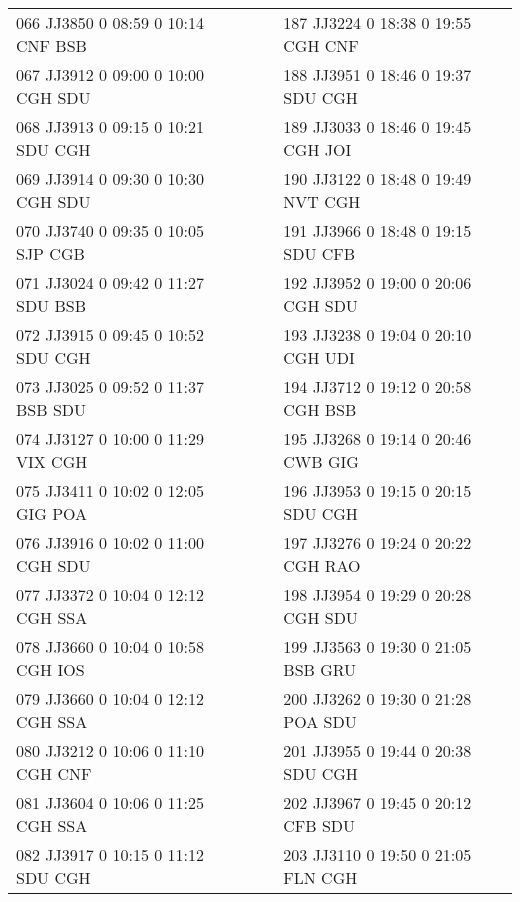 \begin{scriptsize}
\begin{longtable}{l c c l}
066 JJ3850 0 08:59 0 10:14 CNF BSB & & & 187 JJ3224 0 18:38 0 19:55 CGH CNF \\

067 JJ3912 0 09:00 0 10:00 CGH SDU & & & 188 JJ3951 0 18:46 0 19:37 SDU CGH \\

068 JJ3913 0 09:15 0 10:21 SDU CGH & & & 189 JJ3033 0 18:46 0 19:45 CGH JOI \\

069 JJ3914 0 09:30 0 10:30 CGH SDU & & & 190 JJ3122 0 18:48 0 19:49 NVT CGH \\

070 JJ3740 0 09:35 0 10:05 SJP CGB & & & 191 JJ3966 0 18:48 0 19:15 SDU CFB \\

071 JJ3024 0 09:42 0 11:27 SDU BSB & & & 192 JJ3952 0 19:00 0 20:06 CGH SDU \\

072 JJ3915 0 09:45 0 10:52 SDU CGH & & & 193 JJ3238 0 19:04 0 20:10 CGH UDI \\

073 JJ3025 0 09:52 0 11:37 BSB SDU & & & 194 JJ3712 0 19:12 0 20:58 CGH BSB \\

074 JJ3127 0 10:00 0 11:29 VIX CGH & & & 195 JJ3268 0 19:14 0 20:46 CWB GIG \\

075 JJ3411 0 10:02 0 12:05 GIG POA & & & 196 JJ3953 0 19:15 0 20:15 SDU CGH \\

076 JJ3916 0 10:02 0 11:00 CGH SDU & & & 197 JJ3276 0 19:24 0 20:22 CGH RAO \\

077 JJ3372 0 10:04 0 12:12 CGH SSA & & & 198 JJ3954 0 19:29 0 20:28 CGH SDU \\

078 JJ3660 0 10:04 0 10:58 CGH IOS & & & 199 JJ3563 0 19:30 0 21:05 BSB GRU \\

079 JJ3660 0 10:04 0 12:12 CGH SSA & & & 200 JJ3262 0 19:30 0 21:28 POA SDU \\

080 JJ3212 0 10:06 0 11:10 CGH CNF & & & 201 JJ3955 0 19:44 0 20:38 SDU CGH \\

081 JJ3604 0 10:06 0 11:25 CGH SSA & & & 202 JJ3967 0 19:45 0 20:12 CFB SDU \\

082 JJ3917 0 10:15 0 11:12 SDU CGH & & & 203 JJ3110 0 19:50 0 21:05 FLN CGH \\


\end{longtable}
\end{scriptsize}
